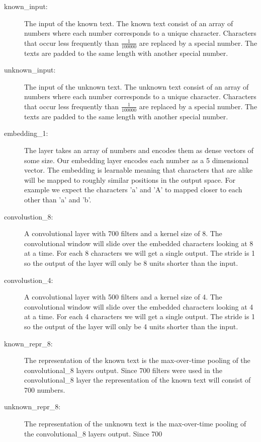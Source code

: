 \begin{description}
    \item[known\_input:] The input of the known text. The known text consist of
        an array of numbers where each number corresponds to a unique character.
        Characters that occur less frequently than $\frac{1}{100000}$ are
        replaced by a special number. The texts are padded to the same length
        with another special number.
    \item[unknown\_input:] The input of the unknown text. The unknown text
        consist of an array of numbers where each number corresponds to a unique
        character. Characters that occur less frequently than $\frac{1}{100000}$
        are replaced by a special number. The texts are padded to the same
        length with another special number.
    \item[embedding\_1:] The layer takes an array of numbers and encodes them as
        dense vectors of some size. Our embedding layer encodes each number as a
        5 dimensional vector. The embedding is learnable meaning that characters
        that are alike will be mapped to roughly similar positions in the output
        space. For example we expect the characters 'a' and 'A' to mapped closer
        to each other than 'a' and 'b'.
    \item[convolustion\_8:] A convolutional layer with 700 filters and a
        kernel size of 8. The convolutional window will slide over the embedded
        characters looking at 8 at a time. For each 8 characters we will get a
        single output. The stride is 1 so the output of the layer will only be
        8 units shorter than the input.
    \item[convolustion\_4:] A convolutional layer with 500 filters and a
        kernel size of 4. The convolutional window will slide over the embedded
        characters looking at 4 at a time. For each 4 characters we will get a
        single output. The stride is 1 so the output of the layer will only be
        4 units shorter than the input.
    \item[known\_repr\_8:] The representation of the known text is the
        max-over-time pooling of the convolutional\_8 layers output. Since 700
        filters were used in the convolutional\_8 layer the representation of
        the known text will consist of 700 numbers.
    \item[unknown\_repr\_8:] The representation of the unknown text is the
        max-over-time pooling of the convolutional\_8 layers output. Since 700

\end{description}
